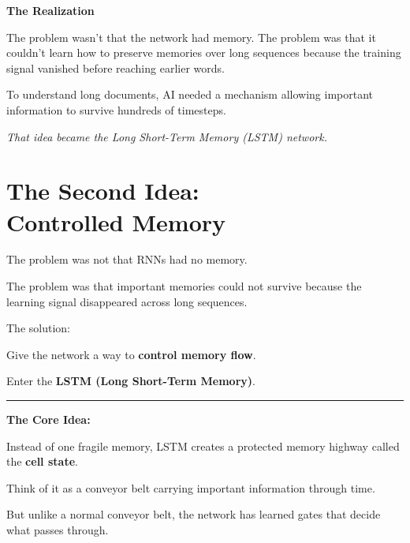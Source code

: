 \documentclass[11pt]{article}
\begin{document}
\vspace{0.1in}

\begin{darkbox}
{\large\textbf{The Realization}}

The problem wasn't that the network had memory. The problem was that it couldn't learn how to preserve memories over long sequences because the training signal vanished before reaching earlier words.

To understand long documents, AI needed a mechanism allowing important information to survive hundreds of timesteps.
\end{darkbox}

\vspace{0.05in}
\textit{That idea became the Long Short-Term Memory (LSTM) network.}

\newpage

\section*{The Second Idea:\\Controlled Memory}

\vspace{0.0in}

The problem was not that RNNs had no memory.

The problem was that important memories could not survive because the learning signal disappeared across long sequences.

The solution:

Give the network a way to \textbf{control memory flow}.

Enter the \textbf{LSTM (Long Short-Term Memory)}.

\vspace{0.01in}
\rule{\textwidth}{0.5pt}
\vspace{0.01in}

\textbf{The Core Idea:}

Instead of one fragile memory, LSTM creates a protected memory highway called the \textbf{cell state}.

Think of it as a conveyor belt carrying important information through time.

But unlike a normal conveyor belt, the network has learned gates that decide what passes through.

\vspace{0.01in}
\end{document}

